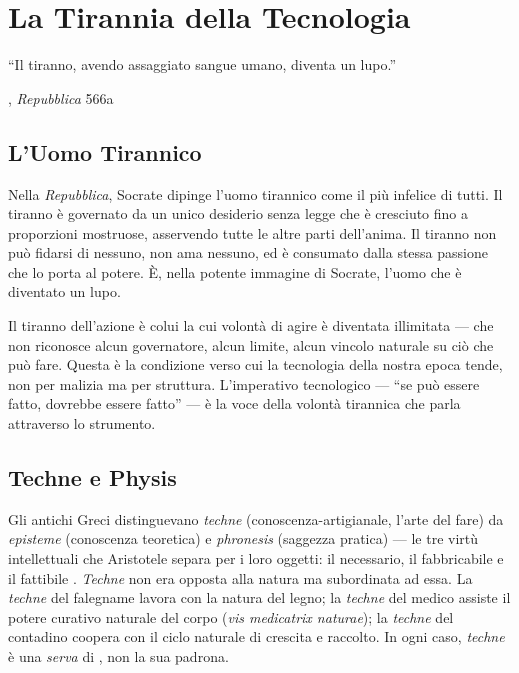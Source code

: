 \chapter{La Tirannia della Tecnologia}

\epigraph{``Il tiranno, avendo assaggiato sangue umano, diventa un lupo.''}
{\textcite{plato1997complete}, \emph{Repubblica} 566a}

\section{L'Uomo Tirannico}

Nella \emph{Repubblica}, Socrate dipinge l'uomo tirannico come il pi\`u
infelice di tutti. Il tiranno \`e governato da un unico desiderio senza
legge che \`e cresciuto fino a proporzioni mostruose, asservendo tutte
le altre parti dell'anima. Il tiranno non pu\`o fidarsi di nessuno, non
ama nessuno, ed \`e consumato dalla stessa passione che lo porta al
potere. \`E, nella potente immagine di Socrate, l'uomo che \`e diventato
un lupo.

Il tiranno dell'azione \`e colui la cui volont\`a di agire \`e diventata
illimitata --- che non riconosce alcun governatore, alcun limite, alcun
vincolo naturale su ci\`o che pu\`o fare. Questa \`e la condizione verso
cui la tecnologia della nostra epoca tende, non per malizia ma per
struttura. L'imperativo tecnologico --- ``se pu\`o essere fatto, dovrebbe
essere fatto'' --- \`e la voce della volont\`a tirannica che parla
attraverso lo strumento.

\section{Techne e Physis}

Gli antichi Greci distinguevano \emph{techne} (conoscenza-artigianale,
l'arte del fare) da \emph{episteme} (conoscenza teoretica) e
\emph{phronesis} (saggezza pratica) --- le tre virt\`u intellettuali che
Aristotele separa per i loro oggetti: il necessario, il fabbricabile e il
fattibile \parencite[VI.3--5]{aristotle2000ethics}. \emph{Techne} non era opposta alla
natura ma subordinata ad essa. La \emph{techne} del falegname lavora con
la natura del legno; la \emph{techne} del medico assiste il potere
curativo naturale del corpo (\emph{vis medicatrix naturae}); la
\emph{techne} del contadino coopera con il ciclo naturale di crescita e
raccolto. In ogni caso, \emph{techne} \`e una \emph{serva} di \physis,
non la sua padrona.

